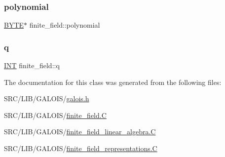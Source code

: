 \subsubsection{\texorpdfstring{polynomial}{polynomial}}
{\footnotesize\ttfamily \mbox{\hyperlink{galois_8h_ab6cc7b4aeb6ea31aba2b3fbfc83ff5e6}{B\+Y\+TE}}$\ast$ finite\+\_\+field\+::polynomial}

\mbox{\label{classfinite__field_a860fdb72f3e11356476cb0841977c21b}} 
\subsubsection{\texorpdfstring{q}{q}}
{\footnotesize\ttfamily \mbox{\hyperlink{galois_8h_a09fddde158a3a20bd2dcadb609de11dc}{I\+NT}} finite\+\_\+field\+::q}



The documentation for this class was generated from the following files\+:\begin{DoxyCompactItemize}
\item 
S\+R\+C/\+L\+I\+B/\+G\+A\+L\+O\+I\+S/\mbox{\hyperlink{galois_8h}{galois.\+h}}\item 
S\+R\+C/\+L\+I\+B/\+G\+A\+L\+O\+I\+S/\mbox{\hyperlink{finite__field_8_c}{finite\+\_\+field.\+C}}\item 
S\+R\+C/\+L\+I\+B/\+G\+A\+L\+O\+I\+S/\mbox{\hyperlink{finite__field__linear__algebra_8_c}{finite\+\_\+field\+\_\+linear\+\_\+algebra.\+C}}\item 
S\+R\+C/\+L\+I\+B/\+G\+A\+L\+O\+I\+S/\mbox{\hyperlink{finite__field__representations_8_c}{finite\+\_\+field\+\_\+representations.\+C}}\end{DoxyCompactItemize}
